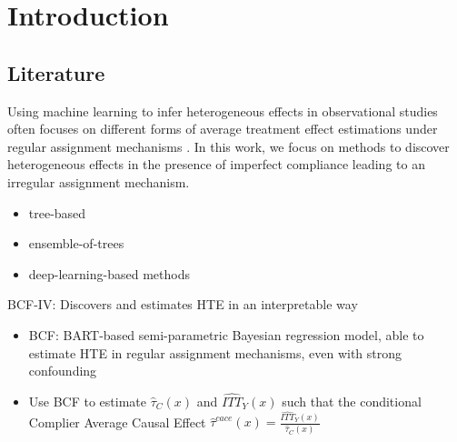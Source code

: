 \chapter{Introduction}

\cite{hahn_bayesian_2020} 

\section{Literature}


Using machine learning to infer heterogeneous effects in observational studies often focuses on different forms of average treatment effect estimations under regular assignment mechanisms \cite{athey_generalized_2019}. In this work, we focus on methods to discover heterogeneous effects in the presence of imperfect compliance leading to an irregular assignment mechanism. 

\begin{itemize}
        \item tree-based 
        \item ensemble-of-trees 
        \item deep-learning-based methods 
\end{itemize}

BCF-IV: Discovers and estimates HTE in an interpretable way %
    \begin{itemize}
        \item BCF: BART-based semi-parametric Bayesian regression model, able to estimate HTE in regular assignment mechanisms, even with strong confounding %
        \item Use BCF to estimate $\hat\tau_C(x)$ and  $\widehat{ITT}_{Y}(x)$ such that the conditional Complier Average Causal Effect $\hat\tau^{cace}(x) = \frac{\widehat{ITT}_{Y}(x)}{\hat\tau_C(x)}$
    \end{itemize}


